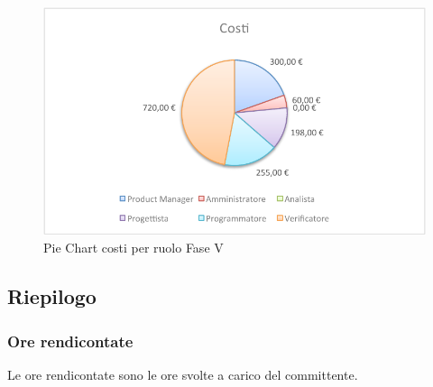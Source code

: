 				\begin{figure}[H]\centering
					\includegraphics[width=\textwidth]{PianoDiProgetto/Pics/ChartTotCostiFaseV.pdf}
					\caption{Pie Chart costi per ruolo Fase V}
				\end{figure}
	\subsection{Riepilogo}
		\subsubsection{Ore rendicontate}
			Le ore rendicontate sono le ore svolte a carico del committente.
